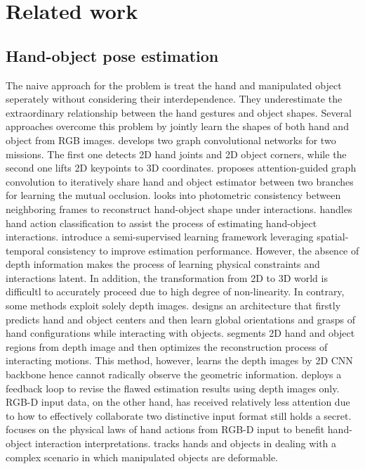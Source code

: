 \section{Related work}
\label{sec:relatedwork}

\subsection{Hand-object pose estimation}
The naive approach for the problem is treat the hand \cite{yang2022dynamic, madadi2017end, deng2017hand3d, oberweger2017deepprior++, iqbal2018hand} and manipulated object \cite{wang2019densefusion, schwarz2015rgb, qi2018frustum, zhou2018voxelnet} seperately without considering their interdependence. They underestimate the extraordinary relationship between the hand gestures and object shapes. Several approaches overcome this problem by jointly learn the shapes of both hand and object from RGB images. \cite{doosti2020hope} develops two graph convolutional networks for two missions. The first one detects 2D hand joints and 2D object corners, while the second one lifts 2D keypoints to 3D coordinates. \cite{tse2022collaborative} proposes attention-guided graph convolution to iteratively share hand and object estimator between two branches for learning the mutual occlusion. \cite{hasson2020leveraging} looks into photometric consistency between neighboring frames to reconstruct hand-object shape under interactions. \cite{tekin2019h+} handles hand action classification to assist the process of estimating hand-object interactions. \cite{liu2021semi} introduce a semi-supervised learning framework leveraging spatial-temporal consistency to improve estimation performance. However, the absence of depth information makes the process of learning physical constraints and interactions latent. In addition, the transformation from 2D to 3D world is difficultl to accurately proceed due to high degree of non-linearity. In contrary, some methods exploit solely depth images. \cite{choi2017robust} designs an architecture that firstly predicts hand and object centers and then learn global orientations and grasps of hand configurations while interacting with objects. \cite{zhang2021single, goudie20173d} segments 2D hand and object regions from depth image and then optimizes the reconstruction process of interacting motions. This method, however, learns the depth images by 2D CNN backbone hence cannot radically observe the geometric information. \cite{oberweger2019generalized} deploys a feedback loop to revise the flawed estimation results using depth images only. RGB-D input data, on the other hand, has received relatively less attention due to how to effectively collaborate two distinctive input format still holds a secret. \cite{kyriazis2013physically} focuses on the physical laws of hand actions from RGB-D input to benefit hand-object interaction interpretations. \cite{tsoli2018joint} tracks hands and objects in dealing with a complex scenario in which manipulated objects are deformable. 

